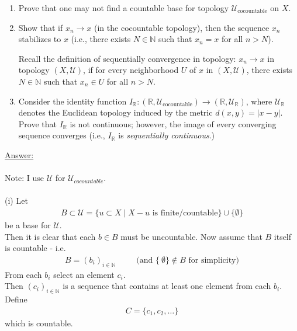 \documentclass[12pt]{article}
\begin{document}
\begin{enumerate}
\item[i)] Prove that one may not find a countable base for topology
\(\mathcal{U}_{\mathrm{cocountable}}\) on \(X\).

\item[ii)] Show that if \(x_n\to x\) (in the cocountable topology),
then the sequence \(x_n\) stabilizes to \(x\) (i.e., there exists
\(N\in\mathbb{N}\) such that \(x_n=x\) for all \(n>N\)).

Recall the definition of sequentially convergence in topology:
\(x_n\to x\) in topology \((X,\mathcal{U})\), if for every neighborhood
\(U\) of \(x\) in \((X,\mathcal{U})\), there exists \(N\in\mathbb{N}\)
such that \(x_n\in U\) for all \(n>N\).

\item[iii)] Consider the identity function
\(I_{\mathbb{R}}:(\mathbb{R},\mathcal{U}_{\mathrm{cocountable}})
\to(\mathbb{R},\mathcal{U}_{\mathbb{R}})\), where
\(\mathcal{U}_{\mathbb{R}}\) denotes the Euclidean topology induced
by the metric \(d(x,y)=|x-y|\). Prove that \(I_{\mathbb{R}}\) is not
continuous; however, the image of every converging sequence converges
(i.e., \(I_{\mathbb{R}}\) is \emph{sequentially continuous}.)
\end{enumerate}
\vspace{1cm}
\underline{Answer:}\\
\\
Note: I use $\mathcal{U}$ for $\mathcal{U}_{cocountable}$.\\
\\
(i) Let
\begin{align*}
B \subset \mathcal{U}
= \{u \subset X \mid X-u \text{ is finite/countable}\}
\cup \{\emptyset\}
\end{align*}
be a base for $\mathcal{U}$.\\
Then it is clear that each $b \in B$
must be uncountable.
Now assume that $B$ itself is countable - i.e.
\begin{align*}
B=(b_i)_{i\in\mathbb{N}} \;\;\;\;\;\;\;\;\; \text{(and $\{\ \emptyset \} \notin B$ for simplicity)}
\end{align*}
From each $b_i$ select an element $c_i$.\\
Then $(c_i)_{i\in\mathbb{N}}$ is a sequence that contains at
least one element from each $b_i$.\\
Define
\begin{align*}
C=\{c_1,c_2,\ldots\}
\end{align*}
which is countable.\\
\end{document}
